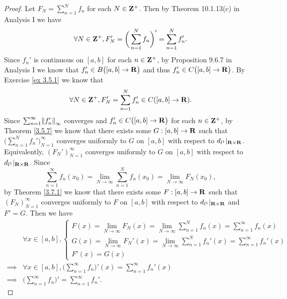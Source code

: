 \begin{proof}
    Let \(F_N = \sum_{n = 1}^N f_n\) for each \(N \in \mathbf{Z}^+\).
    Then by Theorem 10.1.13(c) in Analysis I we have
    \[
        \forall N \in \mathbf{Z}^+, F_N' = \bigg(\sum_{n = 1}^N f_n\bigg)' = \sum_{n = 1}^N f_n'.
    \]
    Since \(f_n'\) is continuous on \([a, b]\) for each \(n \in \mathbf{Z}^+\), by Proposition 9.6.7 in Analysis I we know that \(f_n' \in B\big([a, b] \to \mathbf{R}\big)\) and thus \(f_n' \in C\big([a, b] \to \mathbf{R}\big)\).
    By Exercise \ref{ex 3.5.1} we know that
    \[
        \forall N \in \mathbf{Z}^+, F_N' = \sum_{n = 1}^N f_n' \in C([a, b] \to \mathbf{R}).
    \]
    Since \(\sum_{n = 1}^\infty \norm*{f_n'}_\infty\) converges and \(f_n' \in C\big([a, b] \to \mathbf{R}\big)\) for each \(n \in \mathbf{Z}^+\), by Theorem \ref{3.5.7} we know that there exists some \(G : [a, b] \to \mathbf{R}\) such that \(\big(\sum_{n = 1}^N f_n'\big)_{N = 1}^\infty\) converges uniformly to \(G\) on \([a, b]\) with respect to \(d_{l^1}|_{\mathbf{R} \times \mathbf{R}}\).
    Equivalently, \((F_N')_{N = 1}^\infty\) converges uniformly to \(G\) on \([a, b]\) with respect to \(d_{l^1}|_{\mathbf{R} \times \mathbf{R}}\).
    Since
    \[
        \sum_{n = 1}^\infty f_n(x_0) = \lim_{N \to \infty} \sum_{n = 1}^N f_n(x_0) = \lim_{N \to \infty} F_N(x_0),
    \]
    by Theorem \ref{3.7.1} we know that there exists some \(F : [a, b] \to \mathbf{R}\) such that \((F_N)_{N = 1}^\infty\) converges uniformly to \(F\) on \([a, b]\) with respect to \(d_{l^1}|_{\mathbf{R} \times \mathbf{R}}\) and \(F' = G\).
    Then we have
    \begin{align*}
                 & \forall x \in [a, b], \begin{cases}
                                             F(x) = \lim_{N \to \infty} F_N(x) = \lim_{N \to \infty} \sum_{n = 1}^N f_n(x) = \sum_{n = 1}^\infty f_n(x)    \\
                                             G(x) = \lim_{N \to \infty} F_N'(x) = \lim_{N \to \infty} \sum_{n = 1}^N f_n'(x) = \sum_{n = 1}^\infty f_n'(x) \\
                                             F'(x) = G(x)
                                         \end{cases} \\
        \implies & \forall x \in [a, b], \bigg(\sum_{n = 1}^\infty f_n\bigg)'(x) = \sum_{n = 1}^\infty f_n'(x)                                         \\
        \implies & \bigg(\sum_{n = 1}^\infty f_n\bigg)' = \sum_{n = 1}^\infty f_n'.
    \end{align*}
\end{proof}

